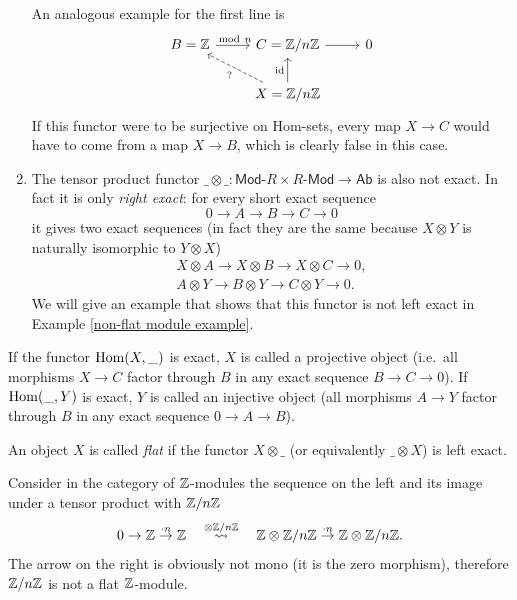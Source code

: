 \begin{example}
\begin{enumerate}
        An analogous example for the first line is
        \[\begin{tikzcd}
        B=\bbZ\arrow[r,"\mod n"] & C=\bbZ/n\bbZ\arrow[r] & 0 \\
         &X=\bbZ/n\bbZ\arrow[ul,dashed,"?"]\arrow[u,
        "\id"] &
        \end{tikzcd}\]
        If this functor were to be surjective on Hom-sets, every map $X\to C$ would have to come from a map $X\to B$, which is clearly false in this case.
        \item The tensor product functor $\_\otimes\_:\mathsf{Mod}\text{-}R\times R\text{-}\mathsf{Mod}\to \mathsf{Ab}$ is also not exact. In fact it is only \emph{right exact}: for every short exact sequence
        \[0\to A\to B\to C\to 0\]
        it gives two exact sequences (in fact they are the same because $X\otimes Y$ is naturally isomorphic to $Y\otimes X$)
        \begin{eqnarray} 
        X\otimes A\to X\otimes B\to X\otimes C\to 0,\\
        A\otimes Y\to B\otimes Y\to C\otimes Y\to 0.
        \end{eqnarray}
        We will give an example that shows that this functor is not left exact in Example \ref{non-flat module example}.
    \end{enumerate}
\end{example}


\begin{defn}
    If the functor $\operatorname{Hom}(X,\_)$ is exact, $X$ is called a projective object (i.e.\ all morphisms $X\to C$ factor through $B$ in any exact sequence $B\to C\to 0$). If $\operatorname{Hom}(\_,Y)$ is exact, $Y$ is called an injective object (all morphisms $A\to Y$ factor through $B$ in any exact sequence $0\to A\to B$).
\end{defn}

\begin{defn}
    An object $X$ is called \emph{flat} if the functor $X\otimes\_$ (or equivalently $\_\otimes X$) is left exact.
\end{defn}

\begin{example}\label{non-flat module example}
    Consider in the category of $\mathbb{Z}$-modules the sequence on the left and its image under a tensor product with $\mathbb{Z}/n\mathbb{Z}$
    \[0\to \mathbb{Z}\overset{\cdot n}\to \mathbb{Z} \quad \overset{\otimes\mathbb{Z}/n\mathbb{Z}}\rightsquigarrow \quad \mathbb{Z}\otimes \mathbb{Z}/n\mathbb{Z}\overset{\cdot n}\to\mathbb{Z}\otimes \mathbb{Z}/n\mathbb{Z}.\]
    The arrow on the right is obviously not mono (it is the zero morphism), therefore $\mathbb{Z}/n\mathbb{Z}$ is not a flat $\mathbb{Z}$-module.
\end{example}

